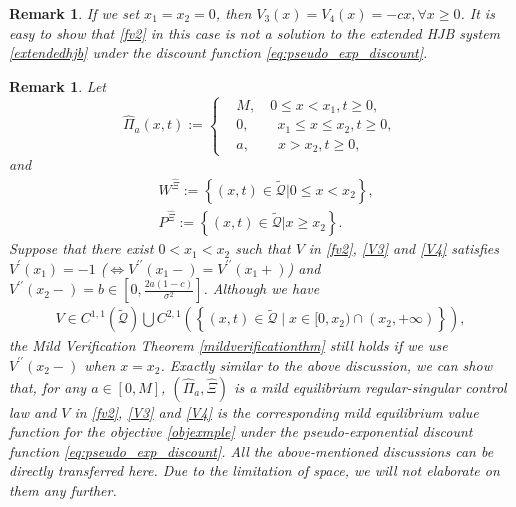 \documentclass[11pt,reqno]{article}%
\newtheorem{remark}[theorem]{Remark}
\numberwithin{equation}{section}
\begin{document}
\begin{remark}
If we set $x_1=x_2=0$, then $V_3(x)=V_4(x)=-cx, \forall x\ge0$. It is easy to show that \eqref{fv2} in this case is not a solution to the extended HJB system \eqref{extendedhjb} under the discount function \eqref{eq:pseudo_exp_discount}. 
\end{remark}

\begin{remark}
Let 
\begin{equation}\nonumber
\hat \Pi_a(x,t) := \left\{\begin{aligned}
& M,\quad  0 \le x < x_1, t\ge0,\\
& 0, \qquad x_1\leq x \leq x_2, t\ge 0,\\
& a, \qquad x > x_2, t\ge 0,
\end{aligned}\right.
\end{equation}
and
\begin{equation}
\begin{aligned}
&W^{\hat{\Xi}}:=\left\{(x,t)\in\mathcal{\tilde{Q}}|0\leq x< x_2\right\},\\
&P^{\hat{\Xi}}:=\left\{(x,t)\in\mathcal{\tilde{Q}}|x\ge x_2\right\}.
\end{aligned}\nonumber
\end{equation}
Suppose that there exist $0<x_1<x_2$ such that $V$ in \eqref{fv2}, \eqref{V3} and \eqref{V4} satisfies $V^\prime(x_1) = -1$
 ($\Leftrightarrow V^{\prime\prime}(x_1-)=V^{\prime\prime}(x_1+)$) and $V^{\prime\prime}(x_2-) = b\in[0,\frac{2a(1-c)}{\sigma^2}]$.
 Although we have
 \begin{equation}
\begin{aligned}V\in C^{1,1}\left(\mathcal{\tilde{Q}}\right)\bigcup C^{2,1}\left(\left\{(x,t)\in\mathcal{\tilde{Q}}\mid x\in[0,x_2)\cap(x_2,+\infty)\right\}\right),\end{aligned}\nonumber
\end{equation}
the Mild Verification Theorem \ref{mildverificationthm} still holds if we use $V^{\prime\prime}(x_2-)$ when $x=x_2$. Exactly similar to the above discussion, we can show that, for any $a\in[0,M]$, $\left(\hat\Pi_a,\hat\Xi\right)$ is a mild equilibrium regular-singular control law and $V$ in \eqref{fv2}, \eqref{V3} and \eqref{V4} is the corresponding mild equilibrium value function for the objective \eqref{objexmple} under the pseudo-exponential discount function \eqref{eq:pseudo_exp_discount}. All the above-mentioned discussions can be directly transferred here. Due to the limitation of space, we will not elaborate on them any further.
\end{remark}
\end{document}

